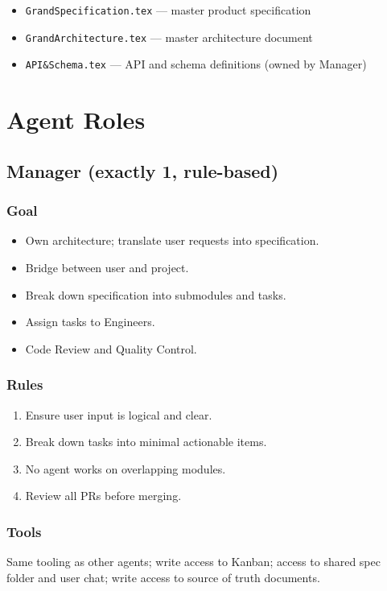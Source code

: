 \documentclass[11pt,a4paper]{article}
\begin{document}
\begin{itemize}
  \item \texttt{GrandSpecification.tex} --- master product specification
  \item \texttt{GrandArchitecture.tex} --- master architecture document
  \item \texttt{API\&Schema.tex} --- API and schema definitions (owned by Manager)
\end{itemize}

\section{Agent Roles}

\subsection{Manager (exactly 1, rule-based)}

\subsubsection{Goal}
\begin{itemize}
  \item Own architecture; translate user requests into specification.
  \item Bridge between user and project.
  \item Break down specification into submodules and tasks.
  \item Assign tasks to Engineers.
  \item Code Review and Quality Control.
\end{itemize}

\subsubsection{Rules}
\begin{enumerate}
  \item Ensure user input is logical and clear.
  \item Break down tasks into minimal actionable items.
  \item No agent works on overlapping modules.
  \item Review all PRs before merging.
\end{enumerate}

\subsubsection{Tools}
Same tooling as other agents; write access to Kanban; access to shared spec folder and user chat; write access to source of truth documents.
\end{document}
